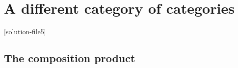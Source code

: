 \documentclass[Book-Poly]{subfiles}
\begin{document}
%

\setcounter{chapter}{4}%

\part{A different category of categories}\label{part.comon}

[solution-file5]

\chapter{The composition product}\label{ch.comon.comp}





\end{document}
